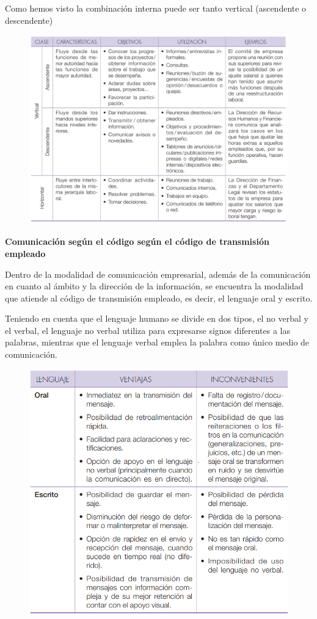 Como hemos visto la combinación interna puede ser
tanto vertical (ascendente o descendente)

\begin{figure}[ht]
    \includegraphics[scale=0.46]{sections/img/table1.png}
\end{figure}

\textbf{Comunicación según el código según el código
de transmisión empleado}

Dentro de la modalidad de comunicación empresarial, 
además de la comunicación en cuanto al ámbito
y la dirección de la información, se encuentra la
modalidad que atiende al código de transmisión
empleado, es decir, el lenguaje oral y escrito.

Teniendo en cuenta que el lenguaje humano se divide
en dos tipos, el no verbal y el verbal, el lenguaje
no verbal utiliza para expresarse signos diferentes
a las palabras, mientras que el lenguaje verbal emplea
la palabra como único medio de comunicación.

\begin{figure}[ht]
    \includegraphics[scale=0.46]{sections/img/table2.png}
\end{figure}

